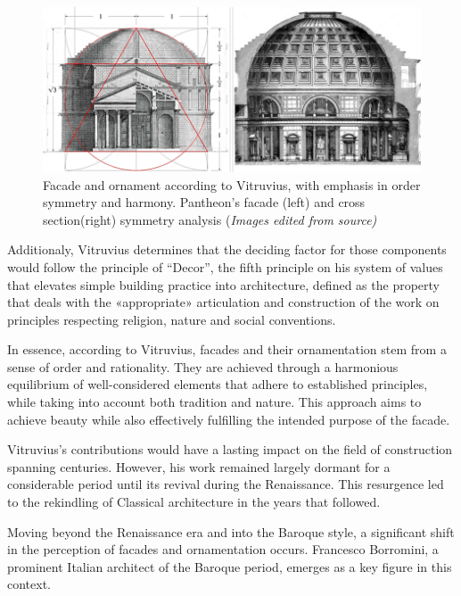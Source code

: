      \begin{figure}[htb]
          \centering
          \includegraphics[width= \linewidth]{Images/VitruvianArchitecture}
          \caption{Facade and ornament according to Vitruvius, with emphasis in order symmetry and harmony. Pantheon's facade (left) and cross section(right) symmetry analysis (\textit{Images edited from source)}}
          \label{fig:Vitruvianarchitecture}
        \end{figure}

Additionaly, Vitruvius determines that the deciding factor for those components would follow the principle of ``Decor'',  the  fifth  principle on his system of values that elevates simple  building  practice  into  architecture, defined as the property that  deals  with  the  «appropriate»  articulation and construction of the work on principles respecting religion, nature and social conventions\cite{Lefas2000}.

In essence, according to Vitruvius, facades and their ornamentation stem from a sense of order and rationality.
They are achieved through a harmonious equilibrium of well-considered elements that adhere to established principles, while taking into account both tradition and nature.
This approach aims to achieve beauty while also effectively fulfilling the intended purpose of the facade.

Vitruvius's contributions would have a lasting impact on the field of construction spanning centuries.
However, his work remained largely dormant for a considerable period until its revival during the Renaissance.
This resurgence led to the rekindling of Classical architecture in the years that followed\cite{Wikipedia2023}.

Moving beyond the Renaissance era and into the Baroque style, a significant shift in the perception of facades and ornamentation occurs.
Francesco Borromini, a prominent Italian architect of the Baroque period, emerges as a key figure in this context.

